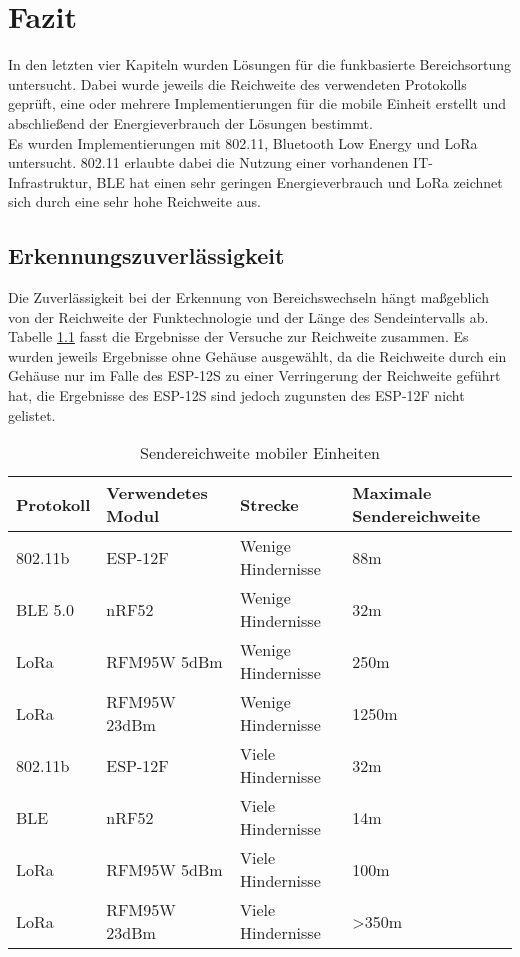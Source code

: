 \chapter{Fazit}
\label{ch:fazit}
In den letzten vier Kapiteln wurden Lösungen für die funkbasierte Bereichsortung untersucht.
Dabei wurde jeweils die Reichweite des verwendeten Protokolls geprüft, eine oder mehrere Implementierungen für die mobile Einheit erstellt und abschließend der Energieverbrauch der Lösungen bestimmt. \\
Es wurden Implementierungen mit 802.11, Bluetooth Low Energy und LoRa untersucht. 
802.11 erlaubte dabei die Nutzung einer vorhandenen IT-Infrastruktur, BLE hat einen sehr geringen Energieverbrauch und LoRa zeichnet sich durch eine sehr hohe Reichweite aus.

\section{Erkennungszuverlässigkeit}
Die Zuverlässigkeit bei der Erkennung von Bereichswechseln hängt maßgeblich von der Reichweite der Funktechnologie und der Länge des Sendeintervalls ab.
Tabelle \ref{table:ranges} fasst die Ergebnisse der Versuche zur Reichweite zusammen. 
Es wurden jeweils Ergebnisse ohne Gehäuse ausgewählt, da die Reichweite durch ein Gehäuse nur im Falle des ESP-12S zu einer Verringerung der Reichweite geführt hat, die Ergebnisse des ESP-12S sind jedoch zugunsten des ESP-12F nicht gelistet.

\begin{table}[h]
	\centering
	\caption{Sendereichweite mobiler Einheiten}
	\label{table:ranges}
	\begin{tabular}{p{2cm}|p{3.5cm}|p{3.5cm}|p{3cm}}
		Protokoll & Verwendetes Modul & Strecke & Maximale Sendereichweite \\
		\hline
		802.11b & ESP-12F & Wenige Hindernisse & 88m \\
		BLE 5.0 & nRF52 & Wenige Hindernisse & 32m \\
		LoRa & RFM95W 5dBm & Wenige Hindernisse & 250m \\
		LoRa & RFM95W 23dBm & Wenige Hindernisse & 1250m \\
		\hline
		802.11b & ESP-12F  & Viele Hindernisse & 32m \\
		BLE & nRF52  & Viele Hindernisse & 14m \\
		LoRa & RFM95W 5dBm & Viele Hindernisse & 100m \\
		LoRa & RFM95W 23dBm & Viele Hindernisse & >350m \\
	\end{tabular}
\end{table}

